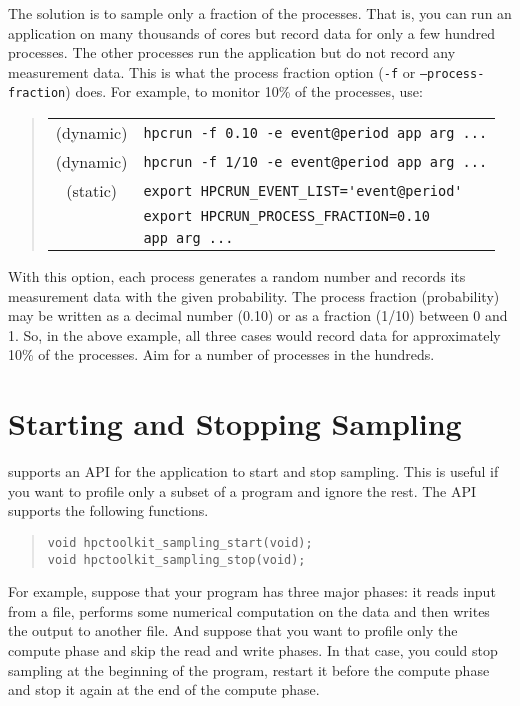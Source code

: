 The solution is to sample only a fraction of the processes.  That is,
you can run an application on many thousands of cores but record data
for only a few hundred processes.  The other processes run the
application but do not record any measurement data.  This is what the
process fraction option ({\tt -f} or {\tt --process-fraction}) does.
For example, to monitor 10\% of the processes, use:

\begin{quote}
\begin{tabular}{@{}cl}
(dynamic) & \verb|hpcrun -f 0.10 -e event@period app arg ...| \\
(dynamic) & \verb|hpcrun -f 1/10 -e event@period app arg ...| \\
(static)  & \verb|export HPCRUN_EVENT_LIST='event@period'| \\
& \verb|export HPCRUN_PROCESS_FRACTION=0.10| \\
& \verb|app arg ...|
\end{tabular}
\end{quote}

With this option, each process generates a random number and records
its measurement data with the given probability.  The process fraction
(probability) may be written as a decimal number (0.10) or as a
fraction (1/10) between 0 and 1.  So, in the above example, all three
cases would record data for approximately 10\% of the processes.  Aim
for a number of processes in the hundreds.


\section{Starting and Stopping Sampling}

\HPCToolkit{} supports an API for the application to start and stop
sampling.  This is useful if you want to profile only a subset of a
program and ignore the rest.  The API supports the following
functions.

\begin{quote}
\begin{verbatim}
void hpctoolkit_sampling_start(void);
void hpctoolkit_sampling_stop(void);
\end{verbatim}
\end{quote}

For example, suppose that your program has three major phases: it
reads input from a file, performs some numerical computation on the
data and then writes the output to another file.  And suppose that you
want to profile only the compute phase and skip the read and write
phases.  In that case, you could stop sampling at the beginning of the
program, restart it before the compute phase and stop it again at the
end of the compute phase.

